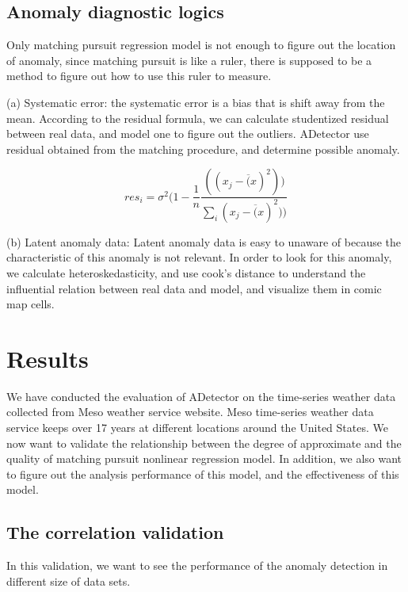 \documentclass{vgtc}                          %
\begin{document}
\subsection{Anomaly diagnostic logics}
Only matching pursuit regression model is not enough to figure out the location of anomaly, since matching pursuit is like a ruler, there is supposed to be a method to figure out how to use this ruler to measure.
	
(a) Systematic error: the systematic error is a bias that is shift away from the mean. According to the residual formula, we can calculate studentized residual between real data, and model one to figure out the outliers. ADetector use residual obtained from the matching procedure, and determine possible anomaly.
			
\begin{equation}
res_i = \sigma^2 ( 1 -\frac{1}{n} \frac{((x_j - \overline(x)^2))}{\sum_i(x_j - \overline(x)^2))}
\end{equation}		 

(b) Latent anomaly data: Latent anomaly data is easy to unaware of because the characteristic of this anomaly is not relevant. In order to look for this anomaly, we calculate heteroskedasticity, and use cook's distance to understand the influential relation between real data and model, and visualize them in comic map cells. 

\section{Results}

We have conducted the evaluation of ADetector on the time-series weather data collected from Meso weather service website. Meso time-series weather data service keeps over 17 years at different locations around the United States. We now want to validate the relationship between the degree of approximate and the quality of matching pursuit nonlinear regression model. In addition, we also want to figure out the analysis performance of this model, and the effectiveness of this model.

\subsection{The correlation validation}

In this validation, we want to see the performance of the anomaly detection in different size of data sets. 
\end{document}

